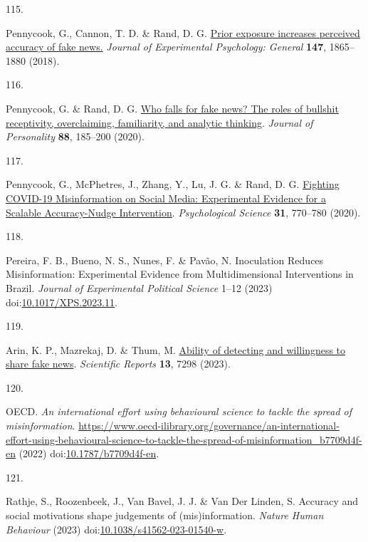 \documentclass[
  doc,floatsintext]{apa6}
\newlength{\cslhangindent}
\newlength{\csllabelwidth}
\newenvironment{CSLReferences}[2] %
 {\begin{list}{}{%
  \setlength{\itemindent}{0pt}
  \setlength{\leftmargin}{0pt}
  \setlength{\parsep}{0pt}
  \ifodd #1
   \setlength{\leftmargin}{\cslhangindent}
   \setlength{\itemindent}{-1\cslhangindent}
  \fi
  \setlength{\itemsep}{#2\baselineskip}}}
 {\end{list}}
\newcommand{\CSLLeftMargin}[1]{\parbox[t]{\csllabelwidth}{\strut#1\strut}}
\newcommand{\CSLRightInline}[1]{\parbox[t]{\linewidth - \csllabelwidth}{\strut#1\strut}}
\begin{document}
\begin{CSLReferences}{0}{0}
\CSLLeftMargin{115. }%
\CSLRightInline{*Pennycook, G., Cannon, T. D. \& Rand, D. G. \href{https://doi.org/10.1037/xge0000465}{Prior exposure increases perceived accuracy of fake news.} \emph{Journal of Experimental Psychology: General} \textbf{147}, 1865--1880 (2018).}

\CSLLeftMargin{116. }%
\CSLRightInline{*Pennycook, G. \& Rand, D. G. \href{https://doi.org/10.1111/jopy.12476}{Who falls for fake news? The roles of bullshit receptivity, overclaiming, familiarity, and analytic thinking}. \emph{Journal of Personality} \textbf{88}, 185--200 (2020).}

\CSLLeftMargin{117. }%
\CSLRightInline{*Pennycook, G., McPhetres, J., Zhang, Y., Lu, J. G. \& Rand, D. G. \href{https://doi.org/10.1177/0956797620939054}{Fighting COVID-19 Misinformation on Social Media: Experimental Evidence for a Scalable Accuracy-Nudge Intervention}. \emph{Psychological Science} \textbf{31}, 770--780 (2020).}

\CSLLeftMargin{118. }%
\CSLRightInline{*Pereira, F. B., Bueno, N. S., Nunes, F. \& Pavão, N. Inoculation Reduces Misinformation: Experimental Evidence from Multidimensional Interventions in Brazil. \emph{Journal of Experimental Political Science} 1--12 (2023) doi:\href{https://doi.org/10.1017/XPS.2023.11}{10.1017/XPS.2023.11}.}

\CSLLeftMargin{119. }%
\CSLRightInline{*Arin, K. P., Mazrekaj, D. \& Thum, M. \href{https://doi.org/10.1038/s41598-023-34402-6}{Ability of detecting and willingness to share fake news}. \emph{Scientific Reports} \textbf{13}, 7298 (2023).}

\CSLLeftMargin{120. }%
\CSLRightInline{*OECD. \emph{An international effort using behavioural science to tackle the spread of misinformation}. \url{https://www.oecd-ilibrary.org/governance/an-international-effort-using-behavioural-science-to-tackle-the-spread-of-misinformation_b7709d4f-en} (2022) doi:\href{https://doi.org/10.1787/b7709d4f-en}{10.1787/b7709d4f-en}.}

\CSLLeftMargin{121. }%
\CSLRightInline{*Rathje, S., Roozenbeek, J., Van Bavel, J. J. \& Van Der Linden, S. Accuracy and social motivations shape judgements of (mis)information. \emph{Nature Human Behaviour} (2023) doi:\href{https://doi.org/10.1038/s41562-023-01540-w}{10.1038/s41562-023-01540-w}.}


\end{CSLReferences}
\end{document}
